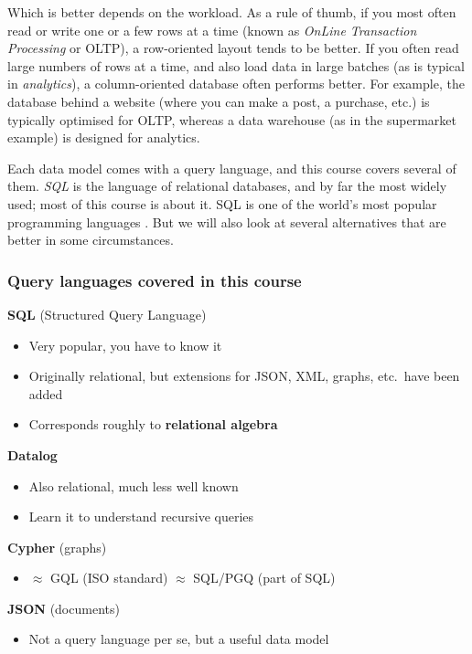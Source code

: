 Which is better depends on the workload.
As a rule of thumb, if you most often read or write one or a few rows at a time (known as \emph{OnLine Transaction Processing} or OLTP), a row-oriented layout tends to be better.
If you often read large numbers of rows at a time, and also load data in large batches (as is typical in \emph{analytics}), a column-oriented database often performs better.
For example, the database behind a website (where you can make a post, a purchase, etc.) is typically optimised for OLTP, whereas a data warehouse (as in the supermarket example) is designed for analytics.

Each data model comes with a query language, and this course covers several of them.
\emph{SQL} is the language of relational databases, and by far the most widely used; most of this course is about it.
SQL is one of the world's most popular programming languages \citep{Caballar2022}.
But we will also look at several alternatives that are better in some circumstances.

\begin{frame}
    \label{s:query-languages}
    \frametitle{Query languages covered in this course}
    \textbf{SQL} (Structured Query Language)
    \begin{itemize}
        \item Very popular, you have to know it
        \item Originally relational, but extensions for JSON, XML, graphs, etc.\ have been added
        \item Corresponds roughly to \textbf{relational algebra}\\[1em]\pause
    \end{itemize}
    \textbf{Datalog}
    \begin{itemize}
        \item Also relational, much less well known
        \item Learn it to understand recursive queries\\[1em]\pause
    \end{itemize}
    \textbf{Cypher} (graphs)
    \begin{itemize}
        \item $\approx$ GQL (ISO standard) $\approx$ SQL/PGQ (part of SQL)\\[1em]\pause
    \end{itemize}
    \textbf{JSON} (documents)
    \begin{itemize}
        \item Not a query language per se, but a useful data model
    \end{itemize}
\end{frame}
\label{l:query-languages}

